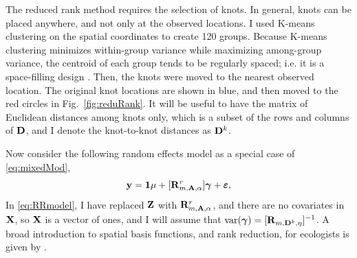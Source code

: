 \documentclass[11pt, titlepage]{article}\usepackage[]{graphicx}\usepackage[]{color}
\begin{document}
\begin{spacing}{1.9}
\begin{flushleft}
The reduced rank method requires the selection of knots.  In general, knots can be placed anywhere, and not only at the observed locations.  I used K-means clustering \citep{MacQ:some:1967} on the spatial coordinates to create 120 groups. Because K-means clustering minimizes within-group variance while maximizing among-group variance, the centroid of each group tends to be regularly spaced; i.e. it is a space-filling design \citep[e.g.][]{Ver:Jans:esti:2015}.  Then, the knots were moved to the nearest observed location. The original knot locations are shown in blue, and then moved to the red circles in Fig.~\ref{fig:reduRank}.  It will be useful to have the matrix of Euclidean distances among knots only, which is a subset of the rows and columns of $\mathbf{D}$, and I denote the knot-to-knot distances as $\mathbf{D}^k$. 

Now consider the following random effects model as a special case of \ref{eq:mixedMod},
\begin{equation} \label{eq:RRmodel}
	\mathbf{y} = \mathbf{1}\mu + [\mathbf{R}^r_{m,\mathbf{A},\alpha}]\mbox{\boldmath $\gamma$} + \mbox{\boldmath $\varepsilon$},
\end{equation}
In \ref{eq:RRmodel}, I have replaced $\mathbf{Z}$ with $\mathbf{R}_{m,\mathbf{A},\alpha}^r$, and there are no covariates in $\mathbf{X}$, so $\mathbf{X}$ is a vector of ones, and I will assume that $\textrm{var}(\mbox{\boldmath $\gamma$})=[\mathbf{R}_{m,\mathbf{D}^k,\eta}]^{-1}$.  A broad introduction to spatial basis functions, and rank reduction, for ecologists is given by \citet{Hefl:Brom:Bros:Bude:basi:2016}.


\end{flushleft}
\end{spacing}
\end{document}
